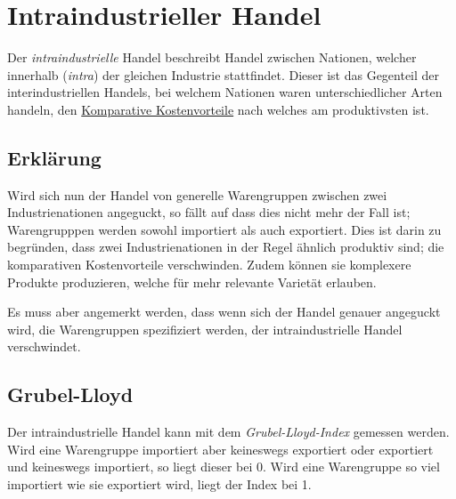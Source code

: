 \documentclass{article}
\begin{document}
\section{Intraindustrieller Handel}
Der \emph{intraindustrielle} Handel beschreibt Handel zwischen Nationen, welcher innerhalb (\emph{intra}) der gleichen Industrie stattfindet. Dieser ist das Gegenteil der interindustriellen Handels, bei welchem Nationen waren unterschiedlicher Arten handeln, den \hyperref[komparative Kostenvorteilen]{Komparative Kostenvorteile} nach welches am produktivsten ist.
 
\subsection{Erklärung} 
Wird sich nun der Handel von generelle Warengruppen zwischen zwei Industrienationen angeguckt, so fällt auf dass dies nicht mehr der Fall ist; Warengrupppen werden sowohl importiert als auch exportiert. Dies ist darin zu begründen, dass zwei Industrienationen in der Regel ähnlich produktiv sind; die komparativen Kostenvorteile verschwinden. Zudem können sie komplexere Produkte produzieren, welche für mehr relevante Varietät erlauben.
 
Es muss aber angemerkt werden, dass wenn sich der Handel genauer angeguckt wird, die Warengruppen spezifiziert werden, der intraindustrielle Handel verschwindet. 
 
\subsection{Grubel-Lloyd} 
Der intraindustrielle Handel kann mit dem \emph{Grubel-Lloyd-Index} gemessen werden. Wird eine Warengruppe importiert aber keineswegs exportiert oder exportiert und keineswegs importiert, so liegt dieser bei 0. Wird eine Warengruppe so viel importiert wie sie exportiert wird, liegt der Index bei 1. 
\end{document}
